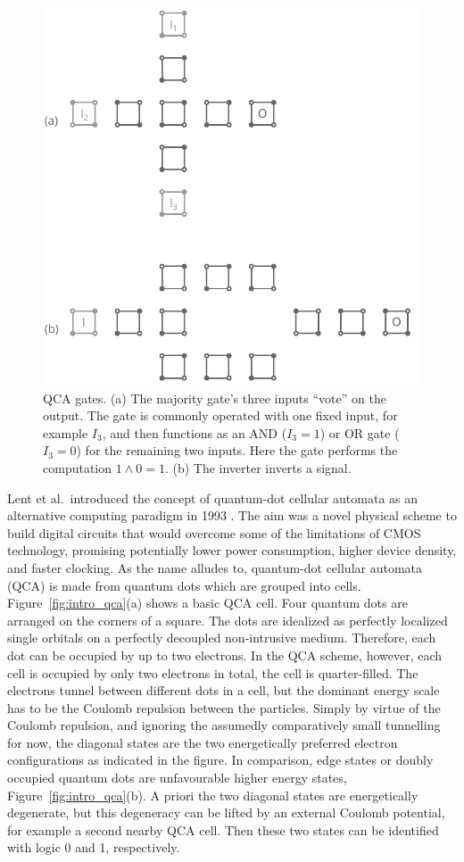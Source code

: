 \begin{figure}
  \center
  \includegraphics{gates}
  \caption{
QCA gates. (a) The majority gate's three inputs ``vote'' on the output. The gate
is commonly operated with one fixed input, for example $I_3$, and then functions
as an AND ($I_3 = 1$) or OR gate ($I_3 = 0$) for the remaining two inputs. Here
the gate performs the computation $1 \land 0 = 1$. (b) The inverter inverts a
signal.
}
  \label{fig:gates}
\end{figure}

Lent et al.\ introduced the concept of quantum-dot cellular automata as an
alternative computing paradigm in 1993 \cite{lent1993quantum}. The aim was a
novel physical scheme to build digital circuits that would overcome some of the
limitations of CMOS technology, promising potentially lower power consumption,
higher device density, and faster clocking. As the name alludes to, quantum-dot
cellular automata (QCA) is made from quantum dots which are grouped into cells.
Figure~\ref{fig:intro_qca}(a) shows a basic QCA cell. Four quantum dots are
arranged on the corners of a square. The dots are idealized as perfectly
localized single orbitals on a perfectly decoupled non-intrusive medium.
Therefore, each dot can be occupied by up to two electrons. In the QCA scheme,
however, each cell is occupied by only two electrons in total, the cell is
quarter-filled. The electrons tunnel between different dots in a cell, but the
dominant energy scale has to be the Coulomb repulsion between the particles.
Simply by virtue of the Coulomb repulsion, and ignoring the assumedly
comparatively small tunnelling for now, the diagonal states are the two
energetically preferred electron configurations as indicated in the figure. In
comparison, edge states or doubly occupied quantum dots are unfavourable higher
energy states, Figure~\ref{fig:intro_qca}(b). A priori the two diagonal states are
energetically degenerate, but this degeneracy can be lifted by an external
Coulomb potential, for example a second nearby QCA cell. Then these two states
can be identified with logic 0 and 1, respectively.


